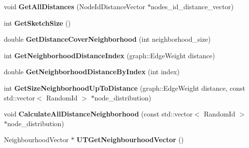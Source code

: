 \begin{DoxyCompactItemize}
\item 
\hypertarget{classall__distance__sketch_1_1NodeSketch_ada61bb576888d1624329386e5fd4f7f7}{}void {\bfseries Get\+All\+Distances} (Node\+Id\+Distance\+Vector $\ast$nodes\+\_\+id\+\_\+distance\+\_\+vector)\label{classall__distance__sketch_1_1NodeSketch_ada61bb576888d1624329386e5fd4f7f7}

\item 
\hypertarget{classall__distance__sketch_1_1NodeSketch_ad7a0937c7470108e2a62b00288c1f7de}{}int {\bfseries Get\+Sketch\+Size} ()\label{classall__distance__sketch_1_1NodeSketch_ad7a0937c7470108e2a62b00288c1f7de}

\item 
\hypertarget{classall__distance__sketch_1_1NodeSketch_a33789e3a32ecc8c1db906bfb90f262ef}{}double {\bfseries Get\+Distance\+Cover\+Neighborhood} (int neighborhood\+\_\+size)\label{classall__distance__sketch_1_1NodeSketch_a33789e3a32ecc8c1db906bfb90f262ef}

\item 
\hypertarget{classall__distance__sketch_1_1NodeSketch_aa22236240ca50b02f673d6127240588d}{}int {\bfseries Get\+Neighborhood\+Distance\+Index} (graph\+::\+Edge\+Weight distance)\label{classall__distance__sketch_1_1NodeSketch_aa22236240ca50b02f673d6127240588d}

\item 
\hypertarget{classall__distance__sketch_1_1NodeSketch_a2ca7507cb573aa193761fd8d3b79bb7f}{}double {\bfseries Get\+Neighborhood\+Distance\+By\+Index} (int index)\label{classall__distance__sketch_1_1NodeSketch_a2ca7507cb573aa193761fd8d3b79bb7f}

\item 
\hypertarget{classall__distance__sketch_1_1NodeSketch_ad3224ffe5a9915427504d91234eba9f8}{}int {\bfseries Get\+Size\+Neighborhood\+Up\+To\+Distance} (graph\+::\+Edge\+Weight distance, const std\+::vector$<$ Random\+Id $>$ $\ast$node\+\_\+distribution)\label{classall__distance__sketch_1_1NodeSketch_ad3224ffe5a9915427504d91234eba9f8}

\item 
\hypertarget{classall__distance__sketch_1_1NodeSketch_a23375a66d300aa5a2b12fe4d94827bfb}{}void {\bfseries Calculate\+All\+Distance\+Neighborhood} (const std\+::vector$<$ Random\+Id $>$ $\ast$node\+\_\+distribution)\label{classall__distance__sketch_1_1NodeSketch_a23375a66d300aa5a2b12fe4d94827bfb}

\item 
\hypertarget{classall__distance__sketch_1_1NodeSketch_a309d1cd0d46cc59ef021f768f3b545c3}{}Neighbourhood\+Vector $\ast$ {\bfseries U\+T\+Get\+Neighbourhood\+Vector} ()\label{classall__distance__sketch_1_1NodeSketch_a309d1cd0d46cc59ef021f768f3b545c3}


\end{DoxyCompactItemize}

